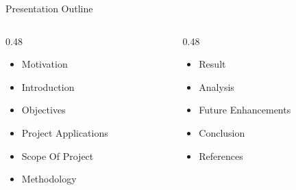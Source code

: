 \begin{frame}{Presentation Outline}
    \begin{columns}[t, onlytextwidth]
        \begin{column}{0.48\textwidth}
            \begin{itemize}
                \item Motivation
                \item Introduction
                \item Objectives
                \item Project Applications
                \item Scope Of Project
                \item Methodology
            \end{itemize}
        \end{column}
        \begin{column}{0.48\textwidth}
            \begin{itemize}
                \item Result
                \item Analysis
                \item Future Enhancements
                \item Conclusion
                \item References
            \end{itemize}
        \end{column}
    \end{columns}
\end{frame}
